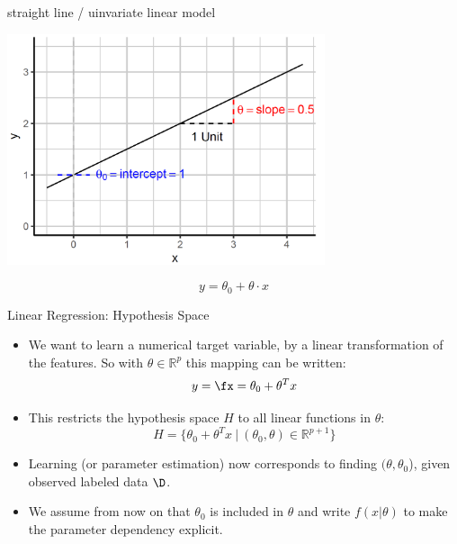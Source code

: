 

\begin{frame}{straight line / uinvariate linear model}

\scriptsize

\begin{center}
\includegraphics[width=0.7\textwidth]{plots/straight-line.png}
\end{center}


\normalsize 

\[
y = \theta_0 + \theta \cdot x
\]

\end{frame}


\begin{frame}{Linear Regression: Hypothesis Space}

\begin{itemize}
\item We want to learn a numerical target variable, by a linear transformation
of the features. So with \(\theta \in \mathbb{R}^p\) this mapping can be
written: \[
y = \fx = \theta_0 + \theta^T x
\]

\item This restricts the hypothesis space \(H\) to all linear functions in
\(\theta\): \[
H = \{ \theta_0 + \theta^T x\ |\ (\theta_0, \theta) \in \mathbb{R}^{p+1} \}
\]

\item Learning (or parameter estimation) now corresponds to finding  \((\theta, \theta_0\)), 
given observed labeled data \(\D\). 

\item We assume from now on that \(\theta_0\) is included in
\(\theta\) and write $f(x|\theta)$ to make the parameter dependency explicit. 
\end{itemize}

\end{frame}

